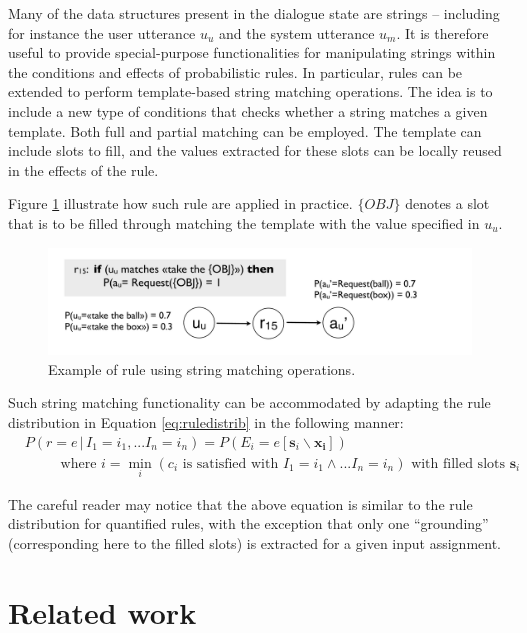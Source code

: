 Many of the data structures present in the dialogue state are strings -- including for instance the user utterance $u_u$ and the system utterance $u_m$. It is therefore useful to provide special-purpose functionalities for manipulating strings within the conditions and effects of probabilistic rules. In particular, rules can be extended to perform template-based string matching operations.  The idea is to include a new type of conditions that checks whether a string matches a given template.  Both full and partial matching can be employed. The template can include slots to fill, and the values extracted for these slots can be locally reused in the effects of the rule.  

Figure \ref{fig:stringmanip} illustrate how such rule are applied in practice.  $\{OBJ\}$ denotes a slot that is to be filled through matching the template with the value specified in $u_u$. 
\begin{figure}[h]
\centering
\includegraphics[scale=0.25]{imgs/stringmanip.pdf}
\caption{Example of rule using string matching operations.}
\label{fig:stringmanip}
\end{figure}

Such string matching functionality can be accommodated by adapting the rule distribution in Equation \eqref{eq:ruledistrib} in the following manner: 
\begin{align}
& P(r\!=\!e \, | \, I_1\!=\!i_1,... I_n\!=\!i_n) = P(E_i = e[\mathbf{s}_i\backslash \mathbf{x_i}]) \label{eq:ruledistribstring}
 \\ 
& \; \; \; \; \; \; \; \; \text{ where } i = \min_i (c_i \text{ is satisfied with } I_1\!=\!i_1 \land ... I_n\!=\!i_n) \text{ with filled slots } \mathbf{s}_i \nonumber 
\end{align}

The careful reader may notice that the above equation is similar to the rule distribution for quantified rules, with the exception that only one ``grounding'' (corresponding here to the filled slots) is extracted for a given input assignment.

\section{Related work}
\label{sec:relatedwork}

